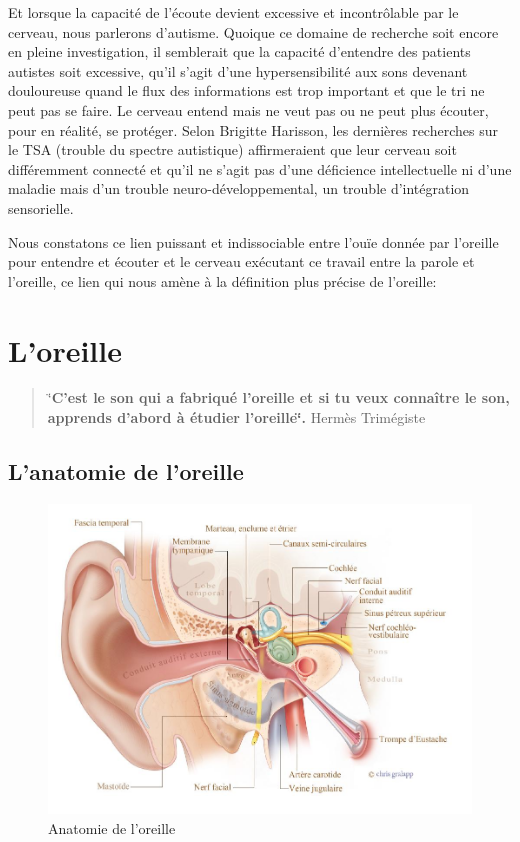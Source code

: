Et lorsque la capacité de l'écoute devient excessive et incontrôlable par le cerveau, nous 
parlerons d'autisme. Quoique
  ce domaine de recherche  soit encore en pleine investigation, il semblerait que la capacité 
  d'entendre des patients autistes soit excessive, qu'il s'agit d'une hypersensibilité aux sons 
  devenant douloureuse quand  le flux des informations est trop important et que le tri ne 
  peut pas se faire. Le cerveau entend mais ne veut pas ou ne peut plus  écouter, pour en 
  réalité, se protéger.
Selon Brigitte Harisson,  
 les dernières recherches sur le TSA (trouble du spectre autistique) affirmeraient que leur
  cerveau soit différemment connecté et qu'il ne s'agit pas d'une déficience intellectuelle ni
   d'une maladie mais d'un trouble neuro-développemental, un trouble
  d'intégration sensorielle.\autocite[Cet ouvrage propose une description unique du TSA
   (trouble du spectre de l'autisme pp. 22--23)]{harrisson.st-charles:lautisme}

Nous constatons ce lien puissant et indissociable  entre l'ouïe donnée
par l'oreille pour entendre et écouter et le cerveau exécutant ce
travail entre la 
parole et l'oreille, ce lien qui nous amène à la définition plus précise de
l'oreille: 





\section {L'oreille}


\begin{quotation}
	\char`\"{}\textbf{C'est le son qui a fabriqué l'oreille et si tu veux connaître
		le son, apprends d'abord à étudier l\textquoteright oreille\char`\"{}.}
	Hermès Trimégiste 
\end{quotation}

\subsection{L'anatomie de l'oreille}
\begin{figure}
	\centering
	\includegraphics[width=1\linewidth]{images/20160624Berufsfeldgruppen.jpg}
	\caption[Anatomie oreille]{Anatomie de l'oreille}
	\label{fig:-20160624berufsfeldgruppen}
\end{figure}

